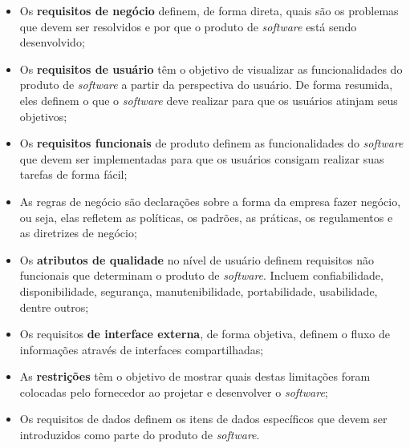 \begin{itemize}
    \begin{itemize}
    
        \item Os \textbf{requisitos de negócio} definem, de forma direta, quais são os problemas que devem ser resolvidos e por que o produto de \textit{software} está sendo desenvolvido;
        
        \item Os \textbf{requisitos de usuário} têm o objetivo de visualizar as funcionalidades do produto de \textit{software} a partir da perspectiva do usuário. De forma resumida, eles definem o que o \textit{software} deve realizar para que os usuários atinjam seus objetivos;
        
        \item Os \textbf{requisitos funcionais} de produto definem as funcionalidades do \textit{software} que devem ser implementadas para que os usuários consigam realizar suas tarefas de forma fácil;
        
        \item As regras de negócio são declarações sobre a forma da empresa fazer negócio, ou seja, elas refletem as políticas, os padrões, as práticas, os regulamentos e as diretrizes de negócio;
        
        \item Os \textbf{atributos de qualidade} no nível de usuário definem requisitos não funcionais que determinam o produto de \textit{software}. Incluem confiabilidade, disponibilidade, segurança, manutenibilidade, portabilidade, usabilidade, dentre outros;
        
        \item Os requisitos\textbf{ de interface externa}, de forma objetiva, definem o fluxo de informações através de interfaces compartilhadas;
        
        \item As \textbf{restrições} têm o objetivo de mostrar quais destas limitações foram colocadas pelo fornecedor ao projetar e desenvolver o \textit{software};
        
        \item Os requisitos de dados definem os itens de dados específicos que devem ser introduzidos como parte do produto de \textit{software}.
    
    \end{itemize}
    

\end{itemize}
